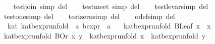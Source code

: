 \begin{isabellebody}
\isanewline
\ \ \isamarkupfalse%
\ test{}join\ {}simp\ del{}\isanewline
\ \ \isamarkupfalse%
\ test{}meet\ {}simp\ del{}\isanewline
\ \ \isamarkupfalse%
\ test{}le{}var{}simp\ del{}\isanewline
\ \ \isamarkupfalse%
\ test{}one{}simp\ del{}\isanewline
\ \ \isamarkupfalse%
\ test{}zero{}simp\ del{}\isanewline
\ \ \isamarkupfalse%
\ o{}def{}simp\ del{}\isanewline
\isanewline
{}\isamarkupfalse%
\isanewline
\isanewline
{}\isamarkupfalse%
\ {}\ kat{}\ kat{}bexpr{}unfold\ {}{}\ {}{}a\ bexpr\ {}\ {}a{}\ \isanewline
\ \ {}kat{}bexpr{}unfold\ {}BLeaf\ x{}\ {}\ x{}\isanewline
{}\ {}kat{}bexpr{}unfold\ {}BOr\ x\ y{}\ {}\ kat{}bexpr{}unfold\ x\ {}\ kat{}bexpr{}unfold\ y{}\isanewline

\end{isabellebody}
